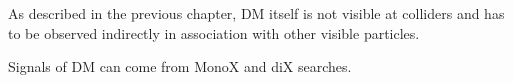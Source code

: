 As described in the previous chapter, DM itself is not visible at colliders and has
to be observed indirectly in association with other visible particles. 

Signals of DM can come from MonoX and diX searches. 